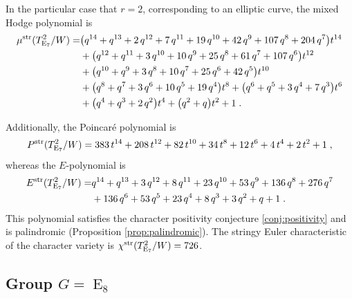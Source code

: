 \documentclass[11pt,english]{amsart}
\numberwithin{equation}{section}
\numberwithin{figure}{section}
\theoremstyle{plain}
\theoremstyle{plain}
\theoremstyle{definition}
\theoremstyle{remark}
\newcommand{\E}{\operatorname{E}}
\newcommand{\str}{\textup{str}}
\begin{document}
In the particular case that $r = 2$, corresponding to an elliptic curve, the mixed Hodge polynomial is
\begin{align*}
\mu^{\str}(T_{\E_7}^2/W) =& {\left(q^{14} + q^{13} + 2 \, q^{12} + 7 \, q^{11} + 19 \, q^{10} + 42 \, q^{9} + 107 \, q^{8} + 204 \, q^{7}\right)} t^{14} \\
& + {\left(q^{12} + q^{11} + 3 \, q^{10} + 10 \, q^{9} + 25 \, q^{8} + 61 \, q^{7} + 107 \, q^{6}\right)} t^{12} \\
& + {\left(q^{10} + q^{9} + 3 \, q^{8} + 10 \, q^{7} + 25 \, q^{6} + 42 \, q^{5}\right)} t^{10} \\
& + {\left(q^{8} + q^{7} + 3 \, q^{6} + 10 \, q^{5} + 19 \, q^{4}\right)} t^{8} + {\left(q^{6} + q^{5} + 3 \, q^{4} + 7 \, q^{3}\right)} t^{6} \\
& + {\left(q^{4} + q^{3} + 2 \, q^{2}\right)} t^{4} + {\left(q^{2} + q\right)} t^{2} + 1\; .
\end{align*}

Additionally, the Poincar\'e polynomial is
\begin{align*}
    P^{\str}(T_{\E_7}^2/W) = 383 \, t^{14} + 208 \, t^{12} + 82 \, t^{10} + 34 \, t^{8} + 12 \, t^{6} + 4 \, t^{4} + 2 \, t^{2} + 1\; ,
\end{align*}
whereas the $E$-polynomial is
\begin{align*}
    E^{\str}(T_{\E_7}^2/W) =& q^{14} + q^{13} + 3 \, q^{12} + 8 \, q^{11} + 23 \, q^{10} + 53 \, q^{9} + 136 \, q^{8} + 276 \, q^{7} \\
    & + 136 \, q^{6} + 53 \, q^{5} + 23 \, q^{4} + 8 \, q^{3} + 3 \, q^{2} + q + 1\; .
\end{align*}
This polynomial satisfies the character positivity conjecture \ref{conj:positivity} and  is palindromic (Proposition \ref{prop:palindromic}). 
The stringy Euler characteristic of the character variety is $\chi^{\str}(T_{\E_7}^2/W)=726$.

\subsection{Group $G = \E_8$}
\end{document}
